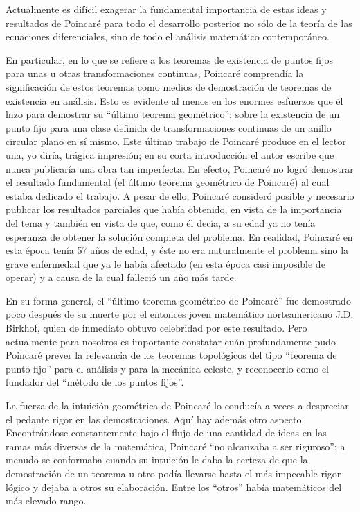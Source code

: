 \documentclass[a4paper, 12pt]{article}
\begin{document}
Actualmente es difícil exagerar la fundamental importancia de estas ideas y resultados de Poincaré  para todo el desarrollo posterior no sólo de la teoría de las ecuaciones diferenciales, sino de todo el análisis matemático contemporáneo.

En particular, en lo que se refiere a los teoremas de existencia de puntos fijos para unas u otras  transformaciones continuas, Poincaré comprendía la significación de estos teoremas como medios de demostración de teoremas de existencia en análisis. Esto es evidente al menos en los enormes esfuerzos que él hizo para demostrar su ``último teorema geométrico'': sobre la existencia de un punto fijo para una clase definida de transformaciones continuas de un anillo circular plano en sí mismo. Este último trabajo de Poincaré produce  en el lector una, yo diría, trágica impresión; en su  corta introducción el autor escribe que nunca publicaría una obra tan imperfecta. En efecto, Poincaré no logró demostrar el resultado fundamental (el último teorema geométrico de Poincaré) al cual estaba dedicado  el trabajo. A pesar de ello, Poincaré consideró posible y necesario publicar los resultados parciales que había obtenido, en vista de la importancia del tema y también en vista de que, como él decía, a su edad ya  no tenía esperanza de obtener la solución completa del problema. En realidad, Poincaré en esta época tenía 57 años de edad, y éste no era naturalmente el problema sino la grave enfermedad que ya le había afectado (en esta época casi imposible de operar) y a causa de la  cual falleció un año más tarde.

En su forma general, el ``último teorema geométrico de Poincaré'' fue demostrado poco después de su muerte por el entonces joven matemático norteamericano J.D. Birkhof, quien de inmediato obtuvo  celebridad por este resultado. Pero actualmente para nosotros es
importante constatar cuán profundamente pudo Poincaré prever la relevancia de los teoremas topológicos del tipo ``teorema de punto fijo'' para el análisis y para
la mecánica celeste, y reconocerlo como el fundador 
del ``método de los puntos fijos''.

La fuerza de la intuición geométrica de Poincaré lo conducía a veces a despreciar el pedante rigor
en las demostraciones. Aquí hay además otro aspecto. Encontrándose constantemente bajo el flujo de una cantidad de ideas en las ramas más diversas de la matemática, Poincaré ``no alcanzaba a ser riguroso''; a menudo se conformaba cuando su intuición le daba la certeza de que la demostración de un teorema u otro podía
llevarse hasta el más impecable rigor lógico y dejaba a otros su elaboración. Entre los ``otros'' había matemáticos del más elevado rango.
\end{document}
